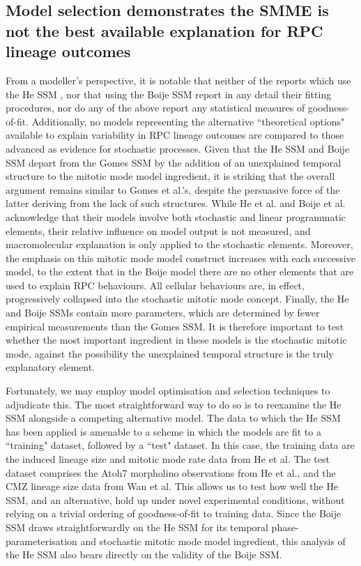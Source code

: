  \subsection{Model selection demonstrates the SMME is not the best available explanation for RPC lineage outcomes}
 
From a modeller's perspective, it is notable that neither of the reports which use the He SSM \cite{He2012,Wan2016}, nor that using the Boije SSM \cite{Boije2015} report in any detail their fitting procedures, nor do any of the above report any statistical measures of goodness-of-fit. Additionally, no models representing the alternative ``theoretical options" available to explain variability in RPC lineage outcomes are compared to those advanced as evidence for stochastic processes. Given that the He SSM and Boije SSM depart from the Gomes SSM by the addition of an unexplained temporal structure to the mitotic mode model ingredient, it is striking that the overall argument remains similar to Gomes et al.'s, despite the persuasive force of the latter deriving from the lack of such structures. While He et al. and Boije et al. acknowledge that their models involve both stochastic and linear programmatic elements, their relative influence on model output is not measured, and macromolecular explanation is only applied to the stochastic elements. Moreover, the emphasis on this mitotic mode model construct increases with each successive model, to the extent that in the Boije model there are no other elements that are used to explain RPC behaviours. All cellular behaviours are, in effect, progressively collapsed into the stochastic mitotic mode concept. Finally, the He and Boije SSMs contain more parameters, which are determined by fewer empirical measurements than the Gomes SSM. It is therefore important to test whether the most important ingredient in these models is the stochastic mitotic mode, against the possibility the unexplained temporal structure is the truly explanatory element.

Fortunately, we may employ model optimisation and selection techniques to adjudicate this. The most straightforward way to do so is to reexamine the He SSM alongside a competing alternative model. The data to which the He SSM has been applied is amenable to a scheme in which the models are fit to a ``training" dataset, followed by a ``test" dataset. In this case, the training data are the induced lineage size and mitotic mode rate data from He et al. The test dataset comprises the Atoh7 morpholino observations from He et al., and the CMZ lineage size data from Wan et al. This allows us to test how well the He SSM, and an alternative, hold up under novel experimental conditions, without relying on a trivial ordering of goodness-of-fit to training data. Since the Boije SSM draws straightforwardly on the He SSM for its temporal phase-parameterisation and stochastic mitotic mode model ingredient, this analysis of the He SSM also bears directly on the validity of the Boije SSM.


